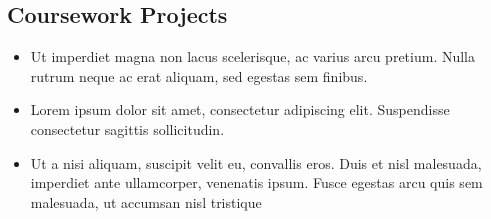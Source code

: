 \documentclass[a4paper]{article}
\begin{document}
\subsection{Coursework Projects} 
\begin{itemize}
    \item Ut imperdiet magna non lacus scelerisque, ac varius arcu pretium. Nulla rutrum neque ac erat aliquam, sed egestas sem finibus. 
    \item Lorem ipsum dolor sit amet, consectetur adipiscing elit. Suspendisse consectetur sagittis sollicitudin. 
    \item Ut a nisi aliquam, suscipit velit eu, convallis eros. Duis et nisl malesuada, imperdiet ante ullamcorper, venenatis ipsum. Fusce egestas arcu quis sem malesuada, ut accumsan nisl tristique
\end{itemize}
\end{document}
